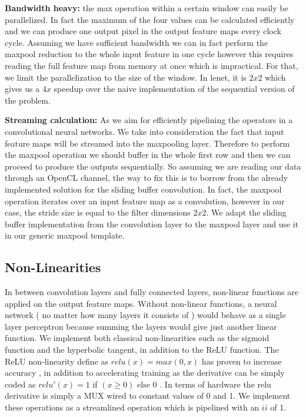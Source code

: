 \textbf{Bandwidth heavy:} the max operation within a certain window can easily be parallelized. In fact the maximum of the four values can be calculated efficiently and we can produce one output pixel in the output feature maps every clock cycle. Assuming we have sufficient bandwidth we can in fact perform the maxpool reduction to the whole input feature in one cycle however this requires reading the full feature map from memory at once which is impractical. For that, we limit the parallelization to the size of the window. In lenet, it is $ 2x2 $ which gives us a $ 4x $ speedup over the naive implementation of the sequential version of the problem. 

\textbf{Streaming calculation:} As we aim for efficiently pipelining the operators in a convolutional neural networks. We take into consideration the fact that input feature maps will be streamed into the maxpooling layer. Therefore to perform the maxpool operation we should buffer in the whole first row and then we can proceed to produce the outputs sequentially. So assuming we are reading our data through an OpenCL channel, the way to fix this is to borrow from the already implemented solution for the sliding buffer convolution. In fact, the maxpool operation iterates over an input feature map as a convolution, however in our case, the stride size is equal to the filter dimensions $ 2x2 $. We adapt the sliding buffer implementation from the convolution layer to the maxpool layer and use it in our generic maxpool template. 

\subsection{Non-Linearities} 

In between convolution layers and fully connected layers, non-linear functions are applied on the output feature maps. Without non-linear functions, a neural network ( no matter how many layers it consists of ) would behave as a single layer perceptron because summing the layers would give just another linear function. We implement both classical non-linearities such as the sigmoid function and the hyperbolic tangent, in addition to the ReLU function. The ReLU non-linearity  define as $ relu(x)  = max(0, x) $ has proven to increase accuracy \cite{alexnet}, in addition to accelerating training as the derivative can be simply coded as $ relu'(x) = 1 $ if $ (x \geq 0 ) $ else $ 0 $ .  In terms of hardware the relu derivative is simply a MUX wired to constant values of 0 and 1. We implement these operations as a streamlined operation which is pipelined with an $ ii $ of 1.

